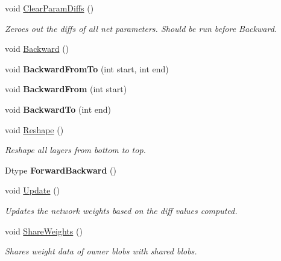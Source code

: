 \begin{DoxyCompactItemize}
\mbox{\label{classcaffe_1_1_net_a3d251c397f812a6d8e162db3a82bb198}} 
void \mbox{\hyperlink{classcaffe_1_1_net_a3d251c397f812a6d8e162db3a82bb198}{Clear\+Param\+Diffs}} ()
\begin{DoxyCompactList}\small\item\em Zeroes out the diffs of all net parameters. Should be run before Backward. \end{DoxyCompactList}\item 
void \mbox{\hyperlink{classcaffe_1_1_net_a7a1a6d17347106dd1284b1b6d28cb4e9}{Backward}} ()
\item 
\mbox{\label{classcaffe_1_1_net_a4cbe2e5f4bdde638fb16568b629526dd}} 
void {\bfseries Backward\+From\+To} (int start, int end)
\item 
\mbox{\label{classcaffe_1_1_net_a36843d26a781f42df9ac5852187df03b}} 
void {\bfseries Backward\+From} (int start)
\item 
\mbox{\label{classcaffe_1_1_net_a1c2d3c2909120250cc29cc98401e39d8}} 
void {\bfseries Backward\+To} (int end)
\item 
void \mbox{\hyperlink{classcaffe_1_1_net_a8417af82aa83be45d39aab735bdead1d}{Reshape}} ()
\begin{DoxyCompactList}\small\item\em Reshape all layers from bottom to top. \end{DoxyCompactList}\item 
\mbox{\label{classcaffe_1_1_net_a3ff72974f0f1ba2edc2cb0f76fd41b56}} 
Dtype {\bfseries Forward\+Backward} ()
\item 
\mbox{\label{classcaffe_1_1_net_a8a2544cefc59d6cbe1bf634f5d5be1c5}} 
void \mbox{\hyperlink{classcaffe_1_1_net_a8a2544cefc59d6cbe1bf634f5d5be1c5}{Update}} ()
\begin{DoxyCompactList}\small\item\em Updates the network weights based on the diff values computed. \end{DoxyCompactList}\item 
void \mbox{\hyperlink{classcaffe_1_1_net_a4850fdb3eea1b04c97642546c0dcccf7}{Share\+Weights}} ()
\begin{DoxyCompactList}\small\item\em Shares weight data of owner blobs with shared blobs. \end{DoxyCompactList}\item 

\end{DoxyCompactItemize}
